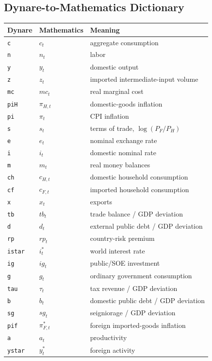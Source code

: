 \subsection{Dynare-to-Mathematics Dictionary}
\label{app:dynare_dictionary}

\begin{center}
\begin{tabular}{lll}
\hline
Dynare & Mathematics & Meaning \\
\hline
\texttt{c} & \(c_t\) & aggregate consumption \\
\texttt{n} & \(n_t\) & labor \\
\texttt{y} & \(y_t\) & domestic output \\
\texttt{z} & \(z_t\) & imported intermediate-input volume \\
\texttt{mc} & \(mc_t\) & real marginal cost \\
\texttt{piH} & \(\pi_{H,t}\) & domestic-goods inflation \\
\texttt{pi} & \(\pi_t\) & CPI inflation \\
\texttt{s} & \(s_t\) & terms of trade, \(\log(P_F/P_H)\) \\
\texttt{e} & \(e_t\) & nominal exchange rate \\
\texttt{i} & \(i_t\) & domestic nominal rate \\
\texttt{m} & \(m_t\) & real money balances \\
\texttt{ch} & \(c_{H,t}\) & domestic household consumption \\
\texttt{cf} & \(c_{F,t}\) & imported household consumption \\
\texttt{x} & \(x_t\) & exports \\
\texttt{tb} & \(tb_t\) & trade balance / GDP deviation \\
\texttt{d} & \(d_t\) & external public debt / GDP deviation \\
\texttt{rp} & \(rp_t\) & country-risk premium \\
\texttt{istar} & \(i_t^*\) & world interest rate \\
\texttt{ig} & \(ig_t\) & public/SOE investment \\
\texttt{g} & \(g_t\) & ordinary government consumption \\
\texttt{tau} & \(\tau_t\) & tax revenue / GDP deviation \\
\texttt{b} & \(b_t\) & domestic public debt / GDP deviation \\
\texttt{sg} & \(sg_t\) & seigniorage / GDP deviation \\
\texttt{pif} & \(\pi_{F,t}^*\) & foreign imported-goods inflation \\
\texttt{a} & \(a_t\) & productivity \\
\texttt{ystar} & \(y_t^*\) & foreign activity \\
\hline
\end{tabular}
\end{center}

